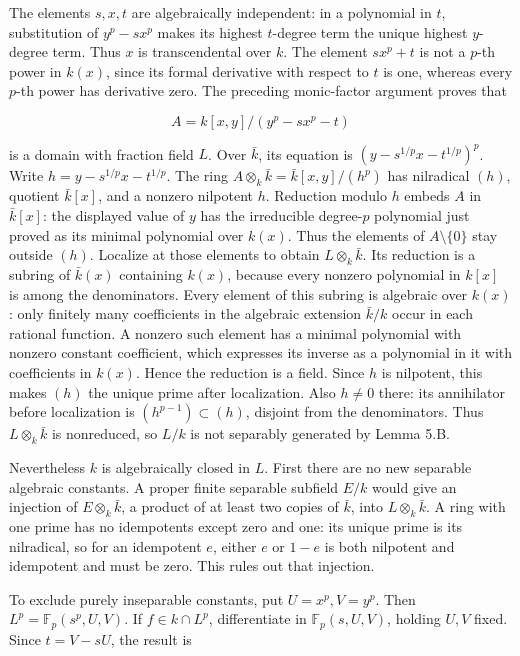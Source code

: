 \documentclass[
]{article}
\begin{document}
The elements \(s,x,t\) are algebraically independent: in a polynomial in
\(t\), substitution of \(y^p-sx^p\) makes its highest \(t\)-degree term
the unique highest \(y\)-degree term. Thus \(x\) is transcendental over
\(k\). The element \(sx^p+t\) is not a \(p\)-th power in \(k(x)\), since
its formal derivative with respect to \(t\) is one, whereas every
\(p\)-th power has derivative zero. The preceding monic-factor argument
proves that

\[
A=k[x,y]/(y^p-sx^p-t)
\]

is a domain with fraction field \(L\). Over \(\bar k\), its equation is
\((y-s^{1/p}x-t^{1/p})^p\). Write \(h=y-s^{1/p}x-t^{1/p}\). The ring
\(A\otimes_k\bar k=\bar k[x,y]/(h^p)\) has nilradical \((h)\), quotient
\(\bar k[x]\), and a nonzero nilpotent \(h\). Reduction modulo \(h\)
embeds \(A\) in \(\bar k[x]\): the displayed value of \(y\) has the
irreducible degree-\(p\) polynomial just proved as its minimal
polynomial over \(k(x)\). Thus the elements of \(A\setminus\{0\}\) stay
outside \((h)\). Localize at those elements to obtain
\(L\otimes_k\bar k\). Its reduction is a subring of \(\bar k(x)\)
containing \(k(x)\), because every nonzero polynomial in \(k[x]\) is
among the denominators. Every element of this subring is algebraic over
\(k(x)\): only finitely many coefficients in the algebraic extension
\(\bar k/k\) occur in each rational function. A nonzero such element has
a minimal polynomial with nonzero constant coefficient, which expresses
its inverse as a polynomial in it with coefficients in \(k(x)\). Hence
the reduction is a field. Since \(h\) is nilpotent, this makes \((h)\)
the unique prime after localization. Also \(h\ne0\) there: its
annihilator before localization is \((h^{p-1})\subset(h)\), disjoint
from the denominators. Thus \(L\otimes_k\bar k\) is nonreduced, so
\(L/k\) is not separably generated by Lemma 5.B.

Nevertheless \(k\) is algebraically closed in \(L\). First there are no
new separable algebraic constants. A proper finite separable subfield
\(E/k\) would give an injection of \(E\otimes_k\bar k\), a product of at
least two copies of \(\bar k\), into \(L\otimes_k\bar k\). A ring with
one prime has no idempotents except zero and one: its unique prime is
its nilradical, so for an idempotent \(e\), either \(e\) or \(1-e\) is
both nilpotent and idempotent and must be zero. This rules out that
injection.

To exclude purely inseparable constants, put \(U=x^p,V=y^p\). Then
\(L^p=\mathbb F_p(s^p,U,V)\). If \(f\in k\cap L^p\), differentiate in
\(\mathbb F_p(s,U,V)\), holding \(U,V\) fixed. Since \(t=V-sU\), the
result is
\end{document}
